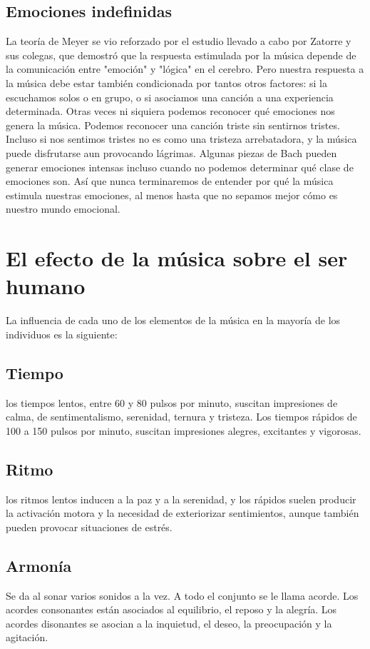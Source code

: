\documentclass{bmcart}
\begin{document}
\subsection*{Emociones indefinidas}
La teoría de Meyer se vio reforzado por el estudio llevado a cabo por Zatorre y sus colegas, que demostró que la respuesta estimulada por la música depende de la comunicación entre "emoción" y "lógica" en el cerebro.
Pero nuestra respuesta a la música debe estar también condicionada por tantos otros factores: si la escuchamos solos o en grupo, o si asociamos una canción a una experiencia determinada.
Otras veces ni siquiera podemos reconocer qué emociones nos genera la música.
Podemos reconocer una canción triste sin sentirnos tristes. Incluso si nos sentimos tristes no es como una tristeza arrebatadora, y la música puede disfrutarse aun provocando lágrimas.
Algunas piezas de Bach pueden generar emociones intensas incluso cuando no podemos determinar qué clase de emociones son.
Así que nunca terminaremos de entender por qué la música estimula nuestras emociones, al menos hasta que no sepamos mejor cómo es nuestro mundo emocional.
\section*{El efecto de la música sobre el ser humano}
La influencia de cada uno de los elementos de la música en la mayoría de los individuos es la siguiente:
\subsection*{Tiempo}
los tiempos lentos, entre 60 y 80 pulsos por minuto, suscitan impresiones de calma, de sentimentalismo, serenidad, ternura y tristeza. Los tiempos rápidos de 100 a 150 pulsos por minuto, suscitan impresiones alegres, excitantes y vigorosas.
\subsection*{Ritmo}
los ritmos lentos inducen a la paz y a la serenidad, y los rápidos suelen producir la activación motora y la necesidad de exteriorizar sentimientos, aunque también pueden provocar situaciones de estrés.
\subsection*{Armonía}
Se da al sonar varios sonidos a la vez. A todo el conjunto se le llama acorde. Los acordes consonantes están asociados al equilibrio, el reposo y la alegría. Los acordes disonantes se asocian a la inquietud, el deseo, la preocupación y la agitación.
\end{document}
